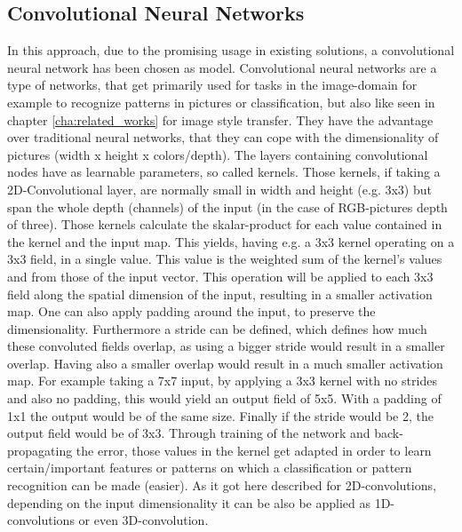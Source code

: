 \subsection{Convolutional Neural Networks}
\label{subsec:app_conv}
In this approach, due to the promising usage in existing solutions, a convolutional neural network has been chosen as model. Convolutional neural networks are a type of networks, that get primarily used for tasks in the image-domain for example to recognize patterns in pictures or classification, but also like seen in chapter \ref{cha:related_works} for image style transfer. They have the advantage over traditional neural networks, that they can cope with the dimensionality of pictures (width x height x colors/depth). The layers containing convolutional nodes have as learnable parameters, so called kernels. \cite{oshea2015introductionConv} Those kernels, if taking a 2D-Convolutional layer, are normally small in width and height (e.g. 3x3) but span the whole depth (channels) of the input (in the case of RGB-pictures depth of three). Those kernels calculate the skalar-product for each value contained in the kernel and the input map. This yields, having e.g. a 3x3 kernel operating on a 3x3 field, in a single value. This value is the weighted sum of the kernel's values and from those of the input vector. This operation will be applied to each 3x3 field along the spatial dimension of the input, resulting in a smaller activation map. One can also apply padding around the input, to preserve the dimensionality. Furthermore a stride can be defined, which defines how much these convoluted fields overlap, as using a bigger stride would result in a smaller overlap. Having also a smaller overlap would result in a much smaller activation map. 
For example taking a 7x7 input, by applying a 3x3 kernel with no strides and also no padding, this would yield an output field of 5x5. With a padding of 1x1 the output would be of the same size. Finally if the stride would be 2, the output field would be of 3x3.
Through training of the network and back-propagating the error, those values in the kernel get adapted in order to learn certain/important features or patterns on which a classification or pattern recognition can be made (easier). As it got here described for 2D-convolutions, depending on the input dimensionality it can be also be applied as 1D-convolutions or even 3D-convolution. 


